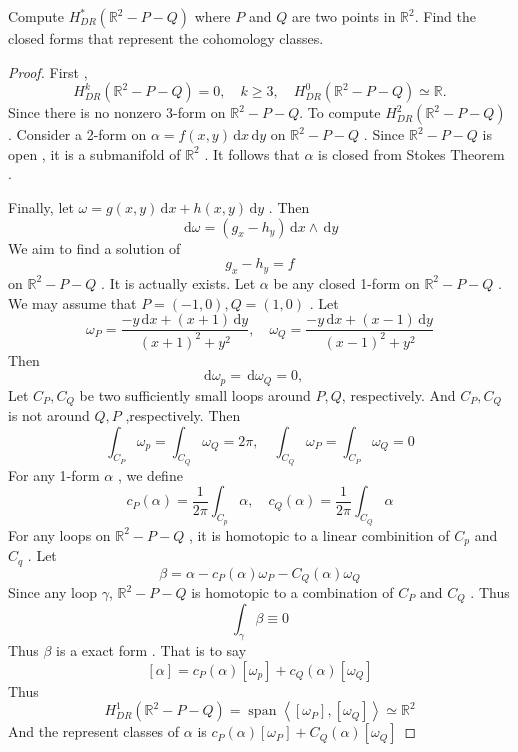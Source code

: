 \documentclass[../main.tex]{subfiles}
\begin{document}
\begin{exercise}{}{}
    Compute \(  H_{DR}^{*}\left( \mathbb{R} ^{2}-P-Q \right)    \) where \(  P  \) and \(  Q  \) are two points in \(  \mathbb{R} ^{2}  \). Find the closed forms that represent the cohomology classes.     
\end{exercise}

\begin{proof}
    First , \[
    H_{DR}^{k}\left( \mathbb{R} ^{2}-P-Q \right)= 0,\quad k\ge 3 ,\quad H_{DR}^{0}\left( \mathbb{R} ^{2}-P-Q \right)\simeq \mathbb{R} .  
    \] Since there is no nonzero 3-form on \(  \mathbb{R} ^{2}-P-Q  \).  
    To compute \(  H^{2}_{DR}\left( \mathbb{R} ^{2}-P-Q \right)   \) .  Consider a 2-form on \(  \alpha = f\left( x,y \right)\,\mathrm{d} x\,\mathrm{d} y   \) on \(  \mathbb{R} ^{2}-P-Q  \) .   Since \(  \mathbb{R} ^{2}-P-Q  \) is open , it is a submanifold of  \(  \mathbb{R} ^{2}  \) .  It follows that \(  \alpha    \) is closed from Stokes Theorem . 
    
    Finally, let \(   \omega =  g\left( x,y \right)\,\mathrm{d} x+ h\left( x,y \right)\,\mathrm{d} y    \) . Then \[
    \,\mathrm{d}  \omega = \left( g_{x}-h_{y} \right)\,\mathrm{d} x\wedge \,\mathrm{d} y 
    \]  We aim to find a solution of \[
    g_{x}-h_{y}= f
    \] on \(  \mathbb{R} ^{2}-P-Q  \) .  It is actually exists. Let \(  \alpha   \) be any closed 1-form on \(  \mathbb{R} ^{2}-P-Q  \) .   We may assume that \(  P= \left( -1,0 \right), Q= \left( 1,0 \right)    \) . Let \[
     \omega _{P}= \frac{-y\,\mathrm{d} x+ \left( x+ 1 \right)\,\mathrm{d} y  }{ \left( x+ 1 \right)^{2}+ y^{2} },\quad  \omega _{Q} = \frac{-y\,\mathrm{d} x+ \left( x-1 \right)\,\mathrm{d} y  }{ \left( x-1 \right)^{2}+ y^{2} }  
    \]  Then \[
    \,\mathrm{d}  \omega _{p}= \,\mathrm{d}  \omega _{Q} = 0,\quad   
    \] Let \(  C_{P} ,C_{Q}  \) be two sufficiently small loops around \(  P,Q  \), respectively. And \(  C_{P} ,C_{Q}  \) is not around \(  Q,P  \) ,respectively.  Then \[
    \int_{C_{P}}  \omega _{p}=  \int_{C_{Q}} \omega _{Q}= 2 \pi ,\quad  \int_{C_{Q}} \omega _{P} = \int_{C_{P}} \omega _{Q}= 0
    \]    For any 1-form \(  \alpha   \) , we define \[
    c_{P}\left(  \alpha   \right)=  \frac{1 }{2 \pi }   \int_{C_{p}} \alpha  ,\quad c_{Q}\left(  \alpha   \right)=  \frac{1 }{2 \pi } \int_{C_{Q}} \alpha  
    \] For any loops on \(  \mathbb{R} ^{2}-P-Q  \) , it is homotopic to a linear combinition of \(  C_{p}  \) and \(  C_{q}  \) .  Let \[
    \beta = \alpha - c_{P}\left( \alpha  \right) \omega _{P }- C_{Q}\left( \alpha  \right) \omega _{Q}  
    \] Since any loop  \(   \gamma   \),  \(  \mathbb{R} ^{2}-P-Q  \) is homotopic to a  combination of  \(  C_{P}  \) and \(  C_{Q}  \) . Thus \[
     \int_{ \gamma }\beta \equiv 0
    \]  Thus \(  \beta   \) is a exact form . That is to say \[
    [\alpha ]= c_{P}\left( \alpha  \right)[ \omega _{p}] + c_{Q}\left( \alpha  \right) [ \omega _{Q}]
    \]  Thus \[
    H_{DR}^{1}\left( \mathbb{R} ^{2}-P-Q \right)=  \operatorname{span}\left<[ \omega _{P}] ,[ \omega _{Q}]\right> \simeq \mathbb{R} ^{2}
    \] And the represent classes of \(  \alpha   \) is  \(  c_{P}\left( \alpha  \right)[ \omega _{P}]   + C_{Q}\left( \alpha  \right)[ \omega _{Q}] \)  
\end{proof}
\end{document}
